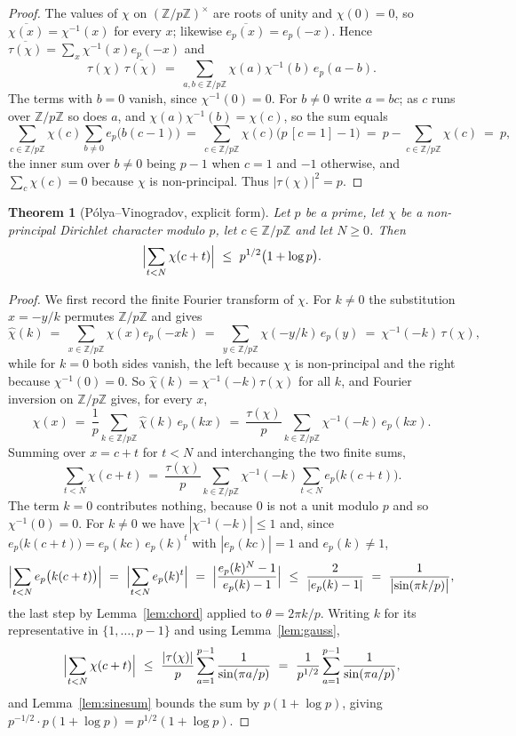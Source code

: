 \documentclass[11pt,reqno]{amsart}
\theoremstyle{plain}
\newtheorem{theorem}{Theorem}[section]
\theoremstyle{definition}
\theoremstyle{remark}
\newcommand{\Z}{\mathbb{Z}}
\begin{document}
\begin{proof}
The values of $\chi$ on $(\Z/p\Z)^{\times}$ are roots of unity and $\chi(0)=0$, so
$\overline{\chi(x)}=\chi^{-1}(x)$ for every $x$; likewise $\overline{e_p(x)}=e_p(-x)$. Hence
$\overline{\tau(\chi)}=\sum_x\chi^{-1}(x)e_p(-x)$ and
\[
  \tau(\chi)\,\overline{\tau(\chi)}
  \ =\ \sum_{a,b\in\Z/p\Z}\chi(a)\chi^{-1}(b)\,e_p(a-b).
\]
The terms with $b=0$ vanish, since $\chi^{-1}(0)=0$. For $b\ne0$ write $a=bc$; as $c$ runs over
$\Z/p\Z$ so does $a$, and $\chi(a)\chi^{-1}(b)=\chi(c)$, so the sum equals
\[
  \sum_{c\in\Z/p\Z}\chi(c)\sum_{b\ne0}e_p\bigl(b(c-1)\bigr)
  \ =\ \sum_{c\in\Z/p\Z}\chi(c)\bigl(p\,[c=1]-1\bigr)
  \ =\ p-\sum_{c\in\Z/p\Z}\chi(c)\ =\ p ,
\]
the inner sum over $b\ne0$ being $p-1$ when $c=1$ and $-1$ otherwise, and
$\sum_c\chi(c)=0$ because $\chi$ is non-principal. Thus $|\tau(\chi)|^{2}=p$.
\end{proof}

\begin{theorem}[Pólya--Vinogradov, explicit form]\label{thm:pv}
Let $p$ be a prime, let $\chi$ be a non-principal Dirichlet character modulo $p$, let
$c\in\Z/p\Z$ and let $N\ge0$. Then
\[
  \Bigl|\sum_{t<N}\chi(c+t)\Bigr|\ \le\ p^{1/2}\bigl(1+\log p\bigr).
\]
\end{theorem}

\begin{proof}
We first record the finite Fourier transform of $\chi$. For $k\ne0$ the substitution
$x=-y/k$ permutes $\Z/p\Z$ and gives
\[
  \widehat\chi(k)\ =\ \sum_{x\in\Z/p\Z}\chi(x)e_p(-xk)
  \ =\ \sum_{y\in\Z/p\Z}\chi(-y/k)\,e_p(y)
  \ =\ \chi^{-1}(-k)\,\tau(\chi),
\]
while for $k=0$ both sides vanish, the left because $\chi$ is non-principal and the right because
$\chi^{-1}(0)=0$. So $\widehat\chi(k)=\chi^{-1}(-k)\tau(\chi)$ for all $k$, and Fourier inversion
on $\Z/p\Z$ gives, for every $x$,
\[
  \chi(x)\ =\ \frac1p\sum_{k\in\Z/p\Z}\widehat\chi(k)\,e_p(kx)
  \ =\ \frac{\tau(\chi)}p\sum_{k\in\Z/p\Z}\chi^{-1}(-k)\,e_p(kx).
\]
Summing over $x=c+t$ for $t<N$ and interchanging the two finite sums,
\[
  \sum_{t<N}\chi(c+t)
  \ =\ \frac{\tau(\chi)}p\sum_{k\in\Z/p\Z}\chi^{-1}(-k)\sum_{t<N}e_p\bigl(k(c+t)\bigr).
\]
The term $k=0$ contributes nothing, because $0$ is not a unit modulo $p$ and so
$\chi^{-1}(0)=0$. For $k\ne0$ we have $|\chi^{-1}(-k)|\le1$ and, since
$e_p\bigl(k(c+t)\bigr)=e_p(kc)\,e_p(k)^{t}$ with $|e_p(kc)|=1$ and $e_p(k)\ne1$,
\[
  \Bigl|\sum_{t<N}e_p\bigl(k(c+t)\bigr)\Bigr|
  \ =\ \Bigl|\sum_{t<N}e_p(k)^{t}\Bigr|
  \ =\ \Bigl|\frac{e_p(k)^{N}-1}{e_p(k)-1}\Bigr|
  \ \le\ \frac2{|e_p(k)-1|}
  \ =\ \frac1{\bigl|\sin(\pi k/p)\bigr|},
\]
the last step by Lemma~\ref{lem:chord} applied to $\theta=2\pi k/p$. Writing $k$ for its
representative in $\{1,\dots,p-1\}$ and using Lemma~\ref{lem:gauss},
\[
  \Bigl|\sum_{t<N}\chi(c+t)\Bigr|
  \ \le\ \frac{|\tau(\chi)|}p\sum_{a=1}^{p-1}\frac1{\sin(\pi a/p)}
  \ =\ \frac1{p^{1/2}}\sum_{a=1}^{p-1}\frac1{\sin(\pi a/p)} ,
\]
and Lemma~\ref{lem:sinesum} bounds the sum by $p(1+\log p)$, giving
$p^{-1/2}\cdot p(1+\log p)=p^{1/2}(1+\log p)$.
\end{proof}
\end{document}
